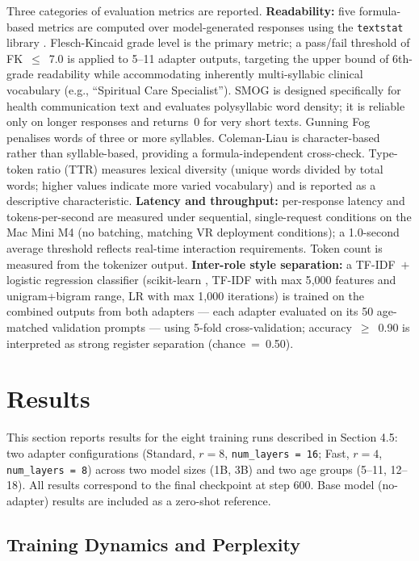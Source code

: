 \documentclass[journal]{IEEEtai}
\begin{document}
Three categories of evaluation metrics are reported. \textbf{Readability:} five formula-based metrics are computed over model-generated responses using the \texttt{textstat} library \cite{bansal2023textstat}. Flesch-Kincaid grade level \cite{kincaid1975fk} is the primary metric; a pass/fail threshold of FK~$\leq$~7.0 is applied to 5--11 adapter outputs, targeting the upper bound of 6th-grade readability while accommodating inherently multi-syllabic clinical vocabulary (e.g., ``Spiritual Care Specialist''). SMOG \cite{mclaughlin1969smog} is designed specifically for health communication text and evaluates polysyllabic word density; it is reliable only on longer responses and returns~0 for very short texts. Gunning Fog \cite{gunning1952fog} penalises words of three or more syllables. Coleman-Liau \cite{coleman1975cli} is character-based rather than syllable-based, providing a formula-independent cross-check. Type-token ratio (TTR) measures lexical diversity (unique words divided by total words; higher values indicate more varied vocabulary) and is reported as a descriptive characteristic. \textbf{Latency and throughput:} per-response latency and tokens-per-second are measured under sequential, single-request conditions on the Mac Mini M4 (no batching, matching VR deployment conditions); a 1.0-second average threshold reflects real-time interaction requirements. Token count is measured from the tokenizer output. \textbf{Inter-role style separation:} a TF-IDF~$+$ logistic regression classifier (scikit-learn \cite{pedregosa2011sklearn}, TF-IDF with max 5{,}000 features and unigram+bigram range, LR with max 1{,}000 iterations) is trained on the combined outputs from both adapters --- each adapter evaluated on its 50 age-matched validation prompts --- using 5-fold cross-validation; accuracy~$\geq$~0.90 is interpreted as strong register separation (chance~=~0.50).

\section{Results}

This section reports results for the eight training runs described in Section 4.5: two adapter configurations (Standard, $r = 8$, \texttt{num\_layers = 16}; Fast, $r = 4$, \texttt{num\_layers = 8}) across two model sizes (1B, 3B) and two age groups (5--11, 12--18). All results correspond to the final checkpoint at step 600. Base model (no-adapter) results are included as a zero-shot reference.

\subsection{Training Dynamics and Perplexity}
\end{document}
